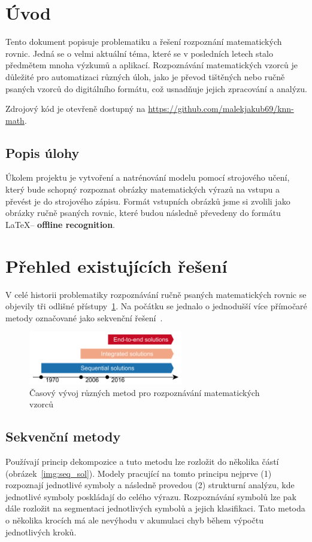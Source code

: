 \section{Úvod}
Tento dokument popisuje problematiku a řešení rozpoznání matematických rovnic. Jedná se o velmi aktuální téma, které se v posledních letech stalo předmětem mnoha výzkumů a aplikací. Rozpoznávání matematických vzorců je důležité pro automatizaci různých úloh, jako je převod tištěných nebo ručně psaných vzorců do digitálního formátu, což usnadňuje jejich zpracování a analýzu.

Zdrojový kód je otevřeně dostupný na \href{https://github.com/malekjakub69/knn-math}{https://github.com/malekjakub69/knn-math}.

\subsection{Popis úlohy}
Úkolem projektu je vytvoření a natrénování modelu pomocí strojového učení, který bude schopný rozpoznat obrázky matematických výrazů na vstupu a převést je do strojového zápisu. Formát vstupních obrázků jsme si zvolili jako obrázky ručně psaných rovnic, které budou následně převedeny do formátu \LaTeX -- \textbf{offline recognition}.


\section{Přehled existujících řešení}
V celé historii problematiky rozpoznávání ručně psaných matematických rovnic se objevily tři odlišné přístupy~\ref{img:method_history}. Na počátku se jednalo o jednodušší více přímočaré metody označované jako sekvenční řešení~\cite{ukr_survey}.

\begin{figure}[H]
    \centering
    \includegraphics[width=0.6\textwidth]{img/method_history.png}
    \caption{Časový vývoj různých metod pro rozpoznávání matematických vzorců}
    \label{img:method_history}
\end{figure}

\subsection{Sekvenční metody}
Používají princip dekompozice a tuto metodu lze rozložit do několika částí (obrázek~\ref{img:seq_sol}). Modely pracující na tomto principu nejprve (1) rozpoznají jednotlivé symboly a následně provedou (2) strukturní analýzu, kde jednotlivé symboly poskládají do celého výrazu. Rozpoznávání symbolů lze pak dále rozložit na segmentaci jednotlivých symbolů a jejich klasifikaci. Tato metoda o několika krocích má ale nevýhodu v akumulaci chyb během výpočtu jednotlivých kroků.

